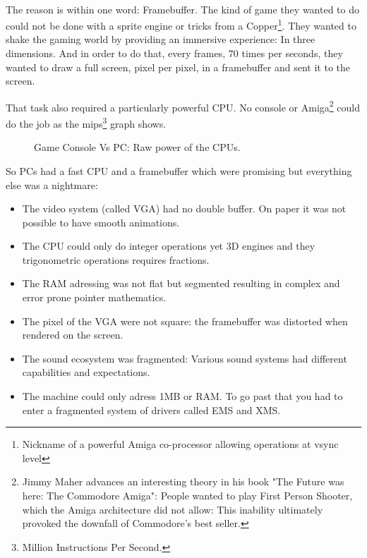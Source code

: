 \\
The reason is within one word: Framebuffer. The kind of game they wanted to do could not be done with a sprite engine or tricks from a Copper\footnote{Nickname of a powerful Amiga co-processor allowing operations at vsync level}. They wanted to shake the gaming world by providing an immersive experience: In three dimensions. And in order to do that, every frames, 70 times per seconds, they wanted to draw a full screen, pixel per pixel, in a framebuffer and sent it to the screen. \\
\par
That task also required a particularly powerful CPU. No console or Amiga\footnote{Jimmy Maher advances an interesting theory in his book "The Future was here: The Commodore Amiga": People wanted to play First Person Shooter, which the Amiga architecture did not allow: This inability ultimately provoked the downfall of Commodore's best seller.} could do the job as the mips\footnote{Million Instructions Per Second.} graph shows.
\par
\begin{figure}[H]
\centering
   \caption{Game Console Vs PC: Raw power of the CPUs.} \label{fig:game_console_vs_PC}
 \end{figure}
 
So PCs had a fast CPU and a framebuffer which were promising but everything else was a nightmare:
\begin{itemize}
\item The video system (called VGA) had no double buffer. On paper it was not possible to have smooth animations.
\item The CPU could only do integer operations yet 3D engines and they trigonometric operations requires fractions.
\item The RAM adressing was not flat but segmented resulting in complex and error prone pointer mathematics.
\item The pixel of the VGA were not square: the framebuffer was distorted when rendered on the screen.
\item The sound ecosystem was fragmented: Various sound systems had different capabilities and expectations.
\item The machine could only adress 1MB or RAM. To go past that you had to enter a fragmented system of drivers called EMS and XMS.
\end{itemize}

